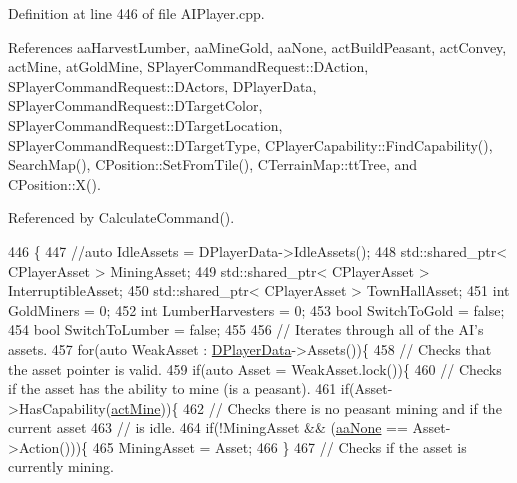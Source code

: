Definition at line 446 of file A\+I\+Player.\+cpp.



References aa\+Harvest\+Lumber, aa\+Mine\+Gold, aa\+None, act\+Build\+Peasant, act\+Convey, act\+Mine, at\+Gold\+Mine, S\+Player\+Command\+Request\+::\+D\+Action, S\+Player\+Command\+Request\+::\+D\+Actors, D\+Player\+Data, S\+Player\+Command\+Request\+::\+D\+Target\+Color, S\+Player\+Command\+Request\+::\+D\+Target\+Location, S\+Player\+Command\+Request\+::\+D\+Target\+Type, C\+Player\+Capability\+::\+Find\+Capability(), Search\+Map(), C\+Position\+::\+Set\+From\+Tile(), C\+Terrain\+Map\+::tt\+Tree, and C\+Position\+::\+X().



Referenced by Calculate\+Command().


\begin{DoxyCode}
446                                                                               \{
447     \textcolor{comment}{//auto IdleAssets = DPlayerData->IdleAssets();}
448     std::shared\_ptr< CPlayerAsset > MiningAsset;
449     std::shared\_ptr< CPlayerAsset > InterruptibleAsset;
450     std::shared\_ptr< CPlayerAsset > TownHallAsset;
451     \textcolor{keywordtype}{int} GoldMiners = 0;
452     \textcolor{keywordtype}{int} LumberHarvesters = 0;
453     \textcolor{keywordtype}{bool} SwitchToGold = \textcolor{keyword}{false};
454     \textcolor{keywordtype}{bool} SwitchToLumber = \textcolor{keyword}{false};
455     
456     \textcolor{comment}{// Iterates through all of the AI's assets.}
457     \textcolor{keywordflow}{for}(\textcolor{keyword}{auto} WeakAsset : \hyperlink{classCAIPlayer_a83b5113c8f7e80df54940b647c5ee2e6}{DPlayerData}->Assets())\{
458         \textcolor{comment}{// Checks that the asset pointer is valid.}
459         \textcolor{keywordflow}{if}(\textcolor{keyword}{auto} Asset = WeakAsset.lock())\{
460             \textcolor{comment}{// Checks if the asset has the ability to mine (is a peasant).}
461             \textcolor{keywordflow}{if}(Asset->HasCapability(\hyperlink{GameDataTypes_8h_a35b98ce26aca678b03c6f9f76e4778cea2e0db284fd05caa56e3867c661ccdd8b}{actMine}))\{
462                 \textcolor{comment}{// Checks there is no peasant mining and if the current asset}
463                 \textcolor{comment}{// is idle.}
464                 \textcolor{keywordflow}{if}(!MiningAsset && (\hyperlink{GameDataTypes_8h_ab47668e651a3032cfb9c40ea2d60d670ac17cc5a0035320c060d7f8074143b507}{aaNone} == Asset->Action()))\{
465                     MiningAsset = Asset;
466                 \}
467                 \textcolor{comment}{// Checks if the asset is currently mining.}

\end{DoxyCode}
